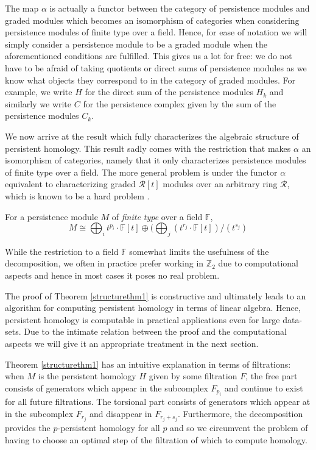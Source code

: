 The map $\alpha$ is actually a functor between the category of persistence modules and graded modules \cite{ghirst} which becomes an isomorphism of categories when considering persistence modules of finite type over a field. Hence, for ease of notation we will simply consider a persistence module to be a graded module when the aforementioned conditions are fulfilled. This gives us a lot for free: we do not have to be afraid of taking quotients or direct sums of persistence modules as we know what objects they correspond to in the category of graded modules. For example, we write $H$ for the direct sum of the persistence modules $H_{k}$ and similarly we write $C$ for the persistence complex given by the sum of the persistence modules $C_{k}$.

We now arrive at the result which fully characterizes the algebraic structure of persistent homology. This result sadly comes with the restriction that makes $\alpha$ an isomorphism of categories, namely that it only characterizes persistence modules of finite type over a field. The more general problem is under the functor $\alpha$ equivalent to characterizing graded $\mathcal{R}[t]$ modules over an arbitrary ring $\mathcal{R}$, which is known to be a hard problem \cite{ghirst}.
\begin{theorem} \label{structurethm1}
  For a persistence module $M$ of \textit{finite type} over a field $\mathbb{F}$,
  \[M \cong \bigoplus_{i} t^{p_{i}} \cdot \mathbb{F}[t] \oplus (\bigoplus_{j} (t^{r_{j}} \cdot \mathbb{F}[t]) / (t^{s_{j}}) \]

\end{theorem}

While the restriction to a field $\mathbb{F}$ somewhat limits the usefulness of the decomposition, we often in practice prefer working in $\mathbb{Z}_{2}$ due to computational aspects and hence in most cases it poses no real problem.

The proof of Theorem \ref{structurethm1} is constructive and ultimately leads to an algorithm for computing persistent homology in terms of linear algebra. Hence, persistent homology is computable in practical applications even for large data-sets. Due to the intimate relation between the proof and the computational aspects we will give it an appropriate treatment in the next section.

Theorem \ref{structurethm1} has an intuitive explanation in terms of filtrations: when $M$ is the persistent homology $H$ given by some filtration $F$, the free part consists of generators which appear in the subcomplex $F_{p_{i}}$ and continue to exist for all future filtrations. The torsional part consists of generators which appear at in the subcomplex $F_{r_{j}}$ and disappear in  $F_{r_{j}+s_{j}}$. Furthermore, the decomposition provides the $p$-persistent homology for all $p$ and so we circumvent the problem of having to choose an optimal step of the filtration of which to compute homology.

